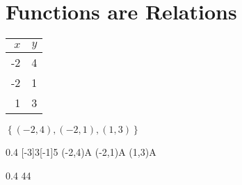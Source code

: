 \section{Functions are Relations}


\noindent
\begin{minipage}{0.2\textwidth}
    \centering
    \begin{tabular}{r|r}
        $x$ & $y$ \\
        \hline\hline
        -2 & 4 \\
        -2 & 1 \\
        1 & 3 \\
    \end{tabular}
\end{minipage}
\hfil
\begin{minipage}{0.2\textwidth}
    $
    \left\{
        (-2,4), (-2,1), (1,3)
    \right\}
    $
\end{minipage}
\hfil
\begin{minipage}{0.2\textwidth}
    \centering
    \begin{myTikzpictureGrid}{0.4} [-3]{3}[-1]{5}
        \tkzDefPoint(-2,4){A} \myDrawPointA
        \tkzDefPoint(-2,1){A} \myDrawPointA
        \tkzDefPoint(1,3){A} \myDrawPointA
    \end{myTikzpictureGrid}
\end{minipage}
\hfil
\begin{minipage}{0.2\textwidth}
    \centering
    \begin{myTikzpictureGrid}{0.4} {4}{4}
    \end{myTikzpictureGrid}
\end{minipage}

